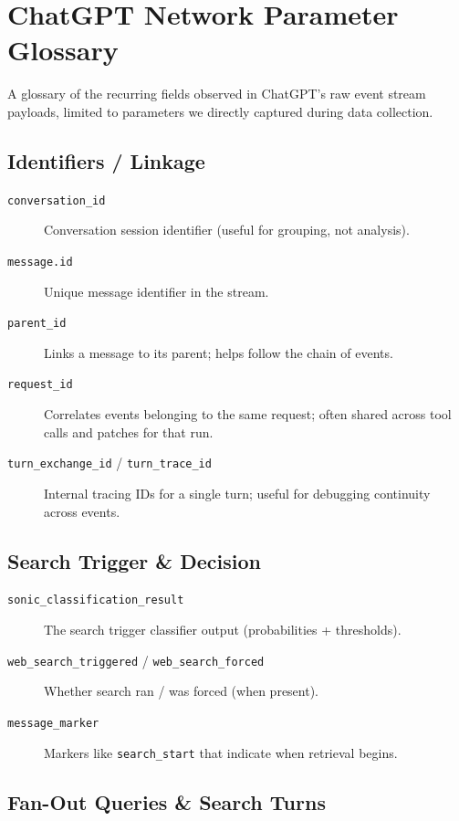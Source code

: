 \chapter{ChatGPT Network Parameter Glossary}
\label{app:network-glossary}

A glossary of the recurring fields observed in ChatGPT's raw event stream payloads,
limited to parameters we directly captured during data collection.

\section*{Identifiers / Linkage}

\begin{description}
    \item[\texttt{conversation\_id}] Conversation session identifier (useful for grouping, not analysis).
    \item[\texttt{message.id}] Unique message identifier in the stream.
    \item[\texttt{parent\_id}] Links a message to its parent; helps follow the chain of events.
    \item[\texttt{request\_id}] Correlates events belonging to the same request; often shared across tool calls and patches for that run.
    \item[\texttt{turn\_exchange\_id} / \texttt{turn\_trace\_id}] Internal tracing IDs for a single turn; useful for debugging continuity across events.
\end{description}

\section*{Search Trigger \& Decision}

\begin{description}
    \item[\texttt{sonic\_classification\_result}] The search trigger classifier output (probabilities + thresholds).
    \item[\texttt{web\_search\_triggered} / \texttt{web\_search\_forced}] Whether search ran / was forced (when present).
    \item[\texttt{message\_marker}] Markers like \texttt{search\_start} that indicate when retrieval begins.
\end{description}

\section*{Fan-Out Queries \& Search Turns}

